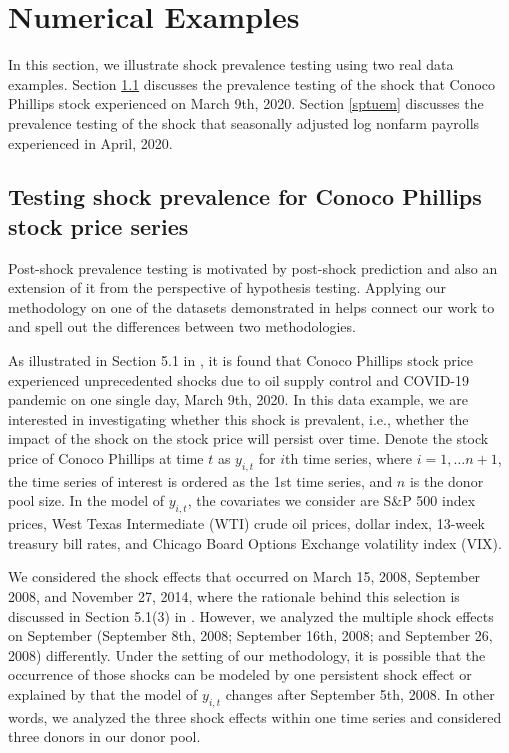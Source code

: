 \documentclass[11pt]{article}
\theoremstyle{definition}
\begin{document}
\section{Numerical Examples}

In this section, we illustrate shock prevalence testing using two real data examples. Section \ref{sptcop} discusses the prevalence testing of the shock that Conoco Phillips stock experienced on March 9th, 2020. Section \ref{sptuem} discusses the prevalence testing of the shock that seasonally adjusted log nonfarm payrolls experienced in April, 2020.

\subsection{Testing shock prevalence for Conoco Phillips stock price series}

\label{sptcop}

Post-shock  prevalence testing is motivated by post-shock prediction  \citep{lin2021minimizing} and also an extension of it from the perspective of hypothesis testing. Applying our methodology  on one of the datasets demonstrated in \cite{lin2021minimizing} helps connect our work to \cite{lin2021minimizing} and spell out the differences between two methodologies.


As illustrated in Section 5.1 in \cite{lin2021minimizing}, it is found that Conoco Phillips stock price experienced unprecedented shocks due to  oil supply control and COVID-19 pandemic on one single day,  March 9th, 2020. In this data example, we are interested in investigating whether this shock is prevalent, i.e., whether the impact of the shock on the stock price will persist over time. Denote the stock price of Conoco Phillips at time $t$ as $y_{i,t}$ for $i$th time series, where $i = 1, \ldots n+1$, the time series of interest is ordered as the 1st time series, and $n$ is the donor pool size. In the model of $y_{i,t}$, the covariates we consider are S\&P 500 index prices, West Texas Intermediate (WTI) crude oil prices, dollar index, 13-week treasury bill rates, and Chicago Board Options Exchange volatility index (VIX). 

We considered the shock effects that occurred on March 15, 2008, September 2008, and November 27, 2014, where the rationale behind this selection is discussed in Section 5.1(3) in  \cite{lin2021minimizing}. However, we analyzed the multiple shock effects on September (September 8th, 2008; September 16th, 2008; and September 26, 2008) differently. Under the  setting of our methodology, it is possible that the occurrence of  those shocks can be modeled by one persistent shock effect or explained by that the model of $y_{i,t}$ changes after September 5th, 2008. In other words, we analyzed the three shock effects within one time series and considered three donors in our donor pool. 
\end{document}
